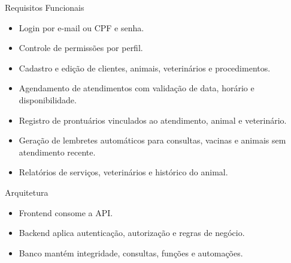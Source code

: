 \documentclass[aspectratio=169,11pt]{beamer}
\begin{document}
\begin{frame}{Requisitos Funcionais}
  \begin{itemize}
    \item Login por e-mail ou CPF e senha.
    \item Controle de permissões por perfil.
    \item Cadastro e edição de clientes, animais, veterinários e procedimentos.
    \item Agendamento de atendimentos com validação de data, horário e disponibilidade.
    \item Registro de prontuários vinculados ao atendimento, animal e veterinário.
    \item Geração de lembretes automáticos para consultas, vacinas e animais sem atendimento recente.
    \item Relatórios de serviços, veterinários e histórico do animal.
  \end{itemize}
\end{frame}

\begin{frame}{Arquitetura}
  \centering

  \vspace{0.7cm}
  \begin{itemize}
    \item Frontend consome a API.
    \item Backend aplica autenticação, autorização e regras de negócio.
    \item Banco mantém integridade, consultas, funções e automações.
  \end{itemize}
\end{frame}
\end{document}
